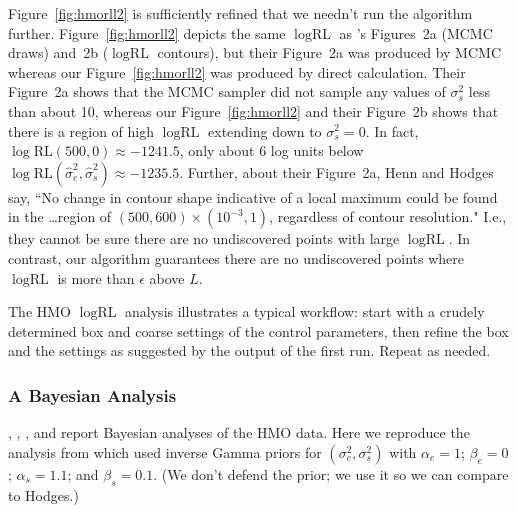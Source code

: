\documentclass{report}
\newcommand{\RLorig}{\text{RL}}
\newcommand{\logRLorig}{\log\RLorig}
\newcommand{\sigssq}{\sigma_s^2}
\newcommand{\sigesq}{\sigma_e^2}
\newcommand{\sshat}{\hat\sigma^2_e,\hat\sigma^2_s}
\begin{document}
Figure~\ref{fig:hmorll2} is sufficiently refined that we needn't run the algorithm further.  Figure~\ref{fig:hmorll2} depicts the same $\logRLorig$ as \cite{henn&hodges:2014}'s Figures~2a (MCMC draws) and~2b ($\logRLorig$ contours), but their Figure~2a was produced by MCMC whereas our Figure~\ref{fig:hmorll2} was produced by direct calculation.  Their Figure~2a shows that the MCMC sampler did not sample any values of $\sigssq$ less than about 10, whereas our Figure~\ref{fig:hmorll2} and their Figure~2b shows that there is a region of high $\logRLorig$ extending down to $\sigssq=0$.  In fact, $\logRLorig(500,0) \approx -1241.5$, only about 6 log units below $\logRLorig(\sshat) \approx -1235.5$.  Further, about their Figure~2a, Henn and Hodges say, ``No change in contour shape indicative of a local maximum could be found in the \dots region of $(500, 600) \times (10^{-3}, 1)$, regardless of contour resolution."  I.e., they cannot be sure there are no undiscovered points with large $\logRLorig$.  In contrast, our algorithm guarantees there are no undiscovered points where $\logRLorig$ is more than $\epsilon$ above $L$.

The HMO $\logRLorig$ analysis illustrates a typical workflow: start with a crudely determined box and coarse settings of the control parameters, then refine the box and the settings as suggested by the output of the first run.  Repeat as needed.

\subsubsection{A Bayesian Analysis}
 \cite{hodges:98}, \cite{wakefield:1998}, \cite{hodges:2013}, and \cite{henn&hodges:2014} report  Bayesian analyses of the HMO data.  Here we reproduce the analysis from \cite{hodges:98} which used inverse Gamma priors for $(\sigesq,\sigssq)$ with $\alpha_e = 1$; $\beta_e = 0$; $\alpha_s = 1.1$; and $\beta_s =0.1$.  (We don't defend the prior; we use it so we can compare to Hodges.)
\end{document}
